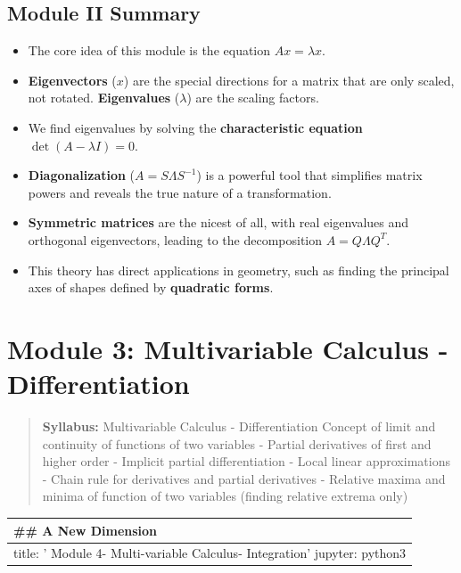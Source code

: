 \documentclass[
  letterpaper,
  DIV=11,
  numbers=noendperiod]{scrreprt}
\providecommand{\tightlist}{%
  \setlength{\itemsep}{0pt}\setlength{\parskip}{0pt}}
\begin{document}
\section{Module II Summary}\label{module-ii-summary}

\begin{itemize}
\tightlist
\item
  The core idea of this module is the equation \(Ax = \lambda x\).
\item
  \textbf{Eigenvectors} (\(x\)) are the special directions for a matrix
  that are only scaled, not rotated. \textbf{Eigenvalues} (\(\lambda\))
  are the scaling factors.
\item
  We find eigenvalues by solving the \textbf{characteristic equation}
  \(\det(A - \lambda I) = 0\).
\item
  \textbf{Diagonalization} (\(A = S \Lambda S^{-1}\)) is a powerful tool
  that simplifies matrix powers and reveals the true nature of a
  transformation.
\item
  \textbf{Symmetric matrices} are the nicest of all, with real
  eigenvalues and orthogonal eigenvectors, leading to the decomposition
  \(A = Q \Lambda Q^T\).
\item
  This theory has direct applications in geometry, such as finding the
  principal axes of shapes defined by \textbf{quadratic forms}.
\end{itemize}


\chapter{Module 3: Multivariable Calculus -
Differentiation}\label{module-3-multivariable-calculus---differentiation}

\begin{quote}
\textbf{Syllabus:} Multivariable Calculus - Differentiation Concept of
limit and continuity of functions of two variables - Partial derivatives
of first and higher order - Implicit partial differentiation - Local
linear approximations - Chain rule for derivatives and partial
derivatives - Relative maxima and minima of function of two variables
(finding relative extrema only)
\end{quote}

\begin{longtable}[]{@{}
  >{\raggedright\arraybackslash}p{}@{}}
\toprule\noalign{}
\begin{minipage}[b]{\linewidth}\raggedright
\#\# A New Dimension
\end{minipage} \\
\midrule\noalign{}
\endhead
\bottomrule\noalign{}
\endlastfoot
title: ' Module 4- Multi-variable Calculus- Integration' jupyter:
python3 \\
\end{longtable}
\end{document}
